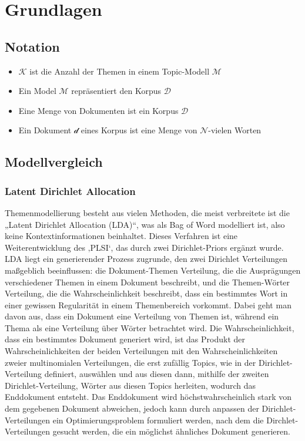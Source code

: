 \documentclass[german,version-2020-11]{uzl-thesis}
\begin{document}
\chapter{Grundlagen}%


\section{Notation}

\begin{itemize}
	\item $\mathcal{K}$ ist die Anzahl der Themen in einem Topic-Modell $\mathcal{M}$
	\item Ein Model $\mathcal{M}$ repräsentiert den Korpus $\mathcal{D}$
	\item Eine Menge von Dokumenten ist ein Korpus $\mathcal{D}$
	\item Ein Dokument $\mathcal{d}$ eines Korpus ist eine Menge von $\mathcal{N}$-vielen 
	Worten 
\end{itemize}


\section{Modellvergleich}
\subsection{Latent Dirichlet Allocation}
Themenmodellierung besteht aus vielen Methoden, die meist verbreitete ist die „Latent Dirichlet Allocation (LDA)“, was als Bag of Word modelliert ist, also keine Kontextinformationen beinhaltet. Dieses Verfahren ist eine Weiterentwicklung des ‚PLSI‘, das durch zwei Dirichlet-Priors ergänzt wurde. LDA liegt ein generierender Prozess zugrunde, den zwei Dirichlet Verteilungen maßgeblich beeinflussen: die Dokument-Themen Verteilung, die die Ausprägungen verschiedener Themen in einem Dokument beschreibt, und die Themen-Wörter Verteilung, die die Wahrscheinlichkeit beschreibt, dass ein bestimmtes Wort in einer gewissen Regularität in einem Themenbereich vorkommt. Dabei geht man davon aus, dass ein Dokument eine Verteilung von Themen ist, während ein Thema als eine Verteilung über Wörter betrachtet wird. 
Die Wahrscheinlichkeit, dass ein bestimmtes Dokument generiert wird, ist das Produkt der Wahrscheinlichkeiten der beiden Verteilungen mit den Wahrscheinlichkeiten zweier multinomialen Verteilungen, die erst zufällig Topics, wie in der Dirichlet-Verteilung definiert, auswählen und aus diesen dann, mithilfe der zweiten Dirichlet-Verteilung, Wörter aus diesen Topics herleiten, wodurch das Enddokument entsteht. Das Enddokument wird höchstwahrscheinlich stark von dem gegebenen Dokument abweichen, jedoch kann durch anpassen der Dirichlet-Verteilungen ein Optimierungsproblem formuliert werden, nach dem die Dirchlet- Verteilungen gesucht werden, die ein möglichst ähnliches Dokument generieren.
\end{document}
